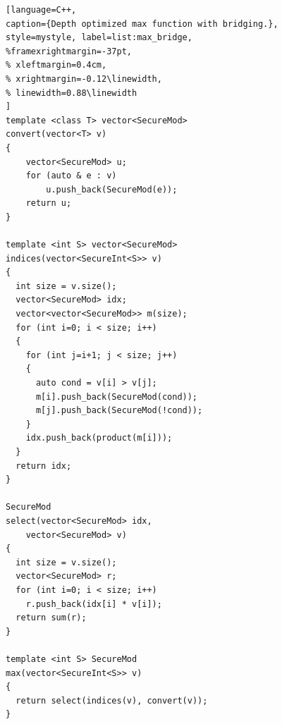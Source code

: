 \begin{figure}[t]
\begin{minipage}{\linewidth}
\begin{lstlisting}[language=C++,
caption={Depth optimized max function with bridging.},
style=mystyle, label=list:max_bridge,
%framexrightmargin=-37pt,
% xleftmargin=0.4cm,
% xrightmargin=-0.12\linewidth,
% linewidth=0.88\linewidth
]
template <class T> vector<SecureMod>
convert(vector<T> v)
{
    vector<SecureMod> u;
    for (auto & e : v)
        u.push_back(SecureMod(e));
    return u;
}

template <int S> vector<SecureMod>
indices(vector<SecureInt<S>> v)
{
  int size = v.size();
  vector<SecureMod> idx;
  vector<vector<SecureMod>> m(size);
  for (int i=0; i < size; i++)
  {
    for (int j=i+1; j < size; j++)
    {
      auto cond = v[i] > v[j];
      m[i].push_back(SecureMod(cond));
      m[j].push_back(SecureMod(!cond));
    }
    idx.push_back(product(m[i]));
  }
  return idx;
}

SecureMod
select(vector<SecureMod> idx,
    vector<SecureMod> v)
{
  int size = v.size();
  vector<SecureMod> r;
  for (int i=0; i < size; i++)
    r.push_back(idx[i] * v[i]);
  return sum(r);
}

template <int S> SecureMod
max(vector<SecureInt<S>> v)
{
  return select(indices(v), convert(v));
}
\end{lstlisting}
\end{minipage}
\end{figure}

